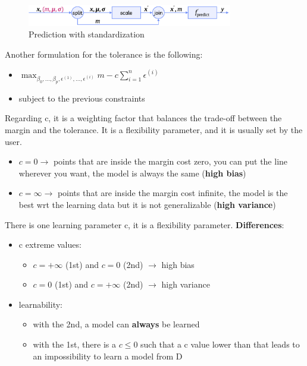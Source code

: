 \begin{figure}[H]
    \centering
    \includegraphics[width=0.8\textwidth]{assets/fig30.png}
    \caption{Prediction with standardization}
\end{figure}

\newpage

Another formulation for the tolerance is the following:
\begin{itemize}
    \item $\operatorname*{max}_{\beta_0,\dots,\beta_p,\epsilon^{(1)},\dots,\epsilon^{(i)}} m - c\sum_{i=1}^{n}\epsilon^{(i)}$
    \item subject to the previous constraints
\end{itemize}

Regarding c, it is a weighting factor that balances the trade-off between the margin and the tolerance. It is a flexibility parameter, and it is usually set by the user.
\begin{itemize}
    \item $c = 0 \to$ points that are inside the margin cost zero, you can put the line wherever you want, the model is always the same (\textbf{high bias})
    \item $c = \infty \to$ points that are inside the margin cost infinite, the model is the best wrt the learning data but it is not generalizable (\textbf{high variance})
\end{itemize}

\begin{warningblock}
    There is one learning parameter c, it is a flexibility parameter.
    \textbf{Differences}:
    \begin{itemize}
        \item c extreme values:
        \begin{itemize}
            \item $c = +\infty$ (1st) and $c = 0$ (2nd) $\to$ high bias 
            \item $c = 0$ (1st) and $c = +\infty$ (2nd) $\to$ high variance
        \end{itemize}
        \item learnability:
        \begin{itemize}
            \item with the 2nd, a model can \textbf{always} be learned 
            \item with the 1st, there is a $c \leq 0$ such that a c value lower than that leads to an impossibility to learn a model from D 
        \end{itemize}
    \end{itemize}
\end{warningblock}

